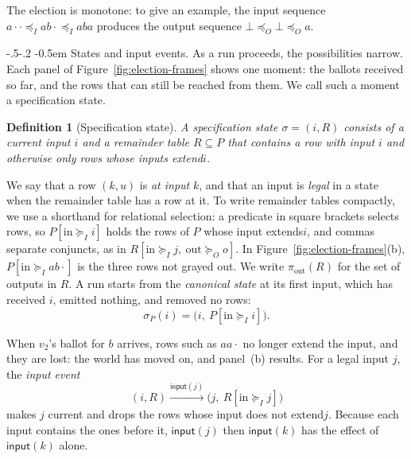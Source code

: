 \documentclass[sigconf]{cidr-2027}
\makeatletter
\newtheorem{definition}{Definition}
\theoremstyle{remark}
\renewcommand\paragraph{\@startsection{paragraph}{4}{\z@}%
  {-.5\baselineskip \@plus -2\p@ \@minus -.2\p@}%
  {-0.5em}%
  {\normalfont\bfseries}}
\newcommand{\InputOrd}{\preceq_I}
\newcommand{\OutputOrd}{\preceq_O}
\newcommand{\InputGe}{\succeq_I}
\newcommand{\OutputGe}{\succeq_O}
\newcommand{\inrel}{extends\xspace}          %
\newcommand{\inrelbase}{extend\xspace}       %
\makeatother
\begin{document}
The election is monotone: to give an example, the input sequence
$a\cdot\cdot\InputOrd ab\cdot\InputOrd aba$ produces the output sequence
$\bot\OutputOrd\bot\OutputOrd a$.

\paragraph{States and input events.}
As a run proceeds, the possibilities narrow.  Each panel of
Figure~\ref{fig:election-frames} shows one moment: the ballots received so
far, and the rows that can still be reached from them.  We call such a moment
a specification state.

\begin{definition}[Specification state]
\label{def:state}
A \emph{specification state} $\sigma=(i,R)$ consists of a \emph{current input}
$i$ and a \emph{remainder table} $R\subseteq P$ that contains a row with input
$i$ and otherwise only rows whose inputs \inrelbase $i$.
\end{definition}

We say that a row $(k,u)$ is
\emph{at input} $k$, and that an input is
\emph{legal} in a state when the remainder table has a row at it.  To write
remainder tables compactly, we use a shorthand for relational selection: a
predicate in square brackets selects rows, so $P[\mathrm{in}\InputGe i]$ holds
the rows of $P$ whose input \inrel $i$, and commas separate conjuncts, as in
$R[\mathrm{in}\InputGe j,\ \mathrm{out}\OutputGe o]$.  In
Figure~\ref{fig:election-frames}(b), $P[\mathrm{in}\InputGe ab\cdot]$ is the
three rows not grayed out.  We write
$\pi_{\mathrm{out}}(R)$ for the set of outputs in $R$.  A run starts from the
\emph{canonical state} at its first input, which has received $i$, emitted
nothing, and removed no rows:
\begin{equation}
  \sigma_P(i)=\bigl(i,\ P[\mathrm{in}\InputGe i]\bigr).
    \label{eq:canonical-state}
\end{equation}

When $v_2$'s ballot for $b$ arrives, rows such as $aa\cdot$ no longer extend
the input, and they are lost: the world has moved on, and panel~(b) results.
For a legal input $j$, the \emph{input event}
\begin{equation}
  (i,R)\xrightarrow{\mathsf{input}(j)}
  \bigl(j,\ R[\mathrm{in}\InputGe j]\bigr)
  \label{eq:input-event}
\end{equation}
makes $j$ current and drops the rows whose input does not \inrelbase $j$.
Because each input contains the ones before it, $\mathsf{input}(j)$ then
$\mathsf{input}(k)$ has the effect of $\mathsf{input}(k)$ alone.
\end{document}
